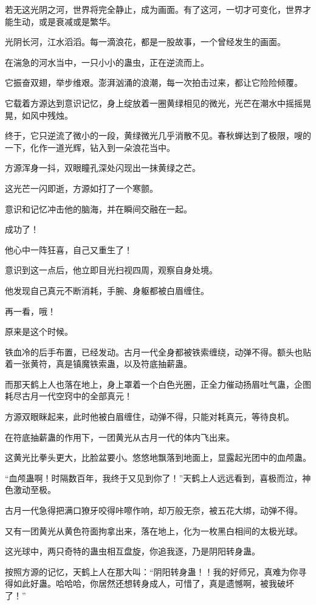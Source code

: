 \begin{this_body}
若无这光阴之河，世界将完全静止，成为画面。有了这河，一切才可变化，世界才能生动，或是衰减或是繁华。

光阴长河，江水滔滔。每一滴浪花，都是一股故事，一个曾经发生的画面。

在湍急的河水当中，一只小小的蛊虫，正在逆流而上。

它振奋双翅，举步维艰。澎湃汹涌的浪潮，每一次拍击过来，都让它险险倾覆。

它载着方源达到意识记忆，身上绽放着一圈黄绿相见的微光，光芒在潮水中摇摇晃晃，如风中残烛。

终于，它只逆流了微小的一段，黄绿微光几乎消散不见。春秋蝉达到了极限，嗖的一下，化作一道光辉，钻入到一朵浪花当中。

方源浑身一抖，双眼瞳孔深处闪现出一抹黄绿之芒。

这光芒一闪即逝，方源如打了一个寒颤。

意识和记忆冲击他的脑海，并在瞬间交融在一起。

成功了！

他心中一阵狂喜，自己又重生了！

意识到这一点后，他立即目光扫视四周，观察自身处境。

他发现自己真元不断消耗，手腕、身躯都被白眉缠住。

再一看，哦！

原来是这个时候。

铁血冷的后手布置，已经发动。古月一代全身都被铁索缠绕，动弹不得。额头也贴着一张黄符，真是镇魔铁索蛊，以及符底抽薪蛊。

而那天鹤上人也落在地上，身上罩着一个白色光圈，正全力催动扬眉吐气蛊，企图耗尽古月一代空窍中的全部真元！

方源双眼眯起来，此时他被白眉缠住，动弹不得，只能对耗真元，等待良机。

在符底抽薪蛊的作用下，一团黄光从古月一代的体内飞出来。

这黄光比拳头更大，比脸盆要小。悠悠地飘落到地面上，显露起光团中的血颅蛊。

“血颅蛊啊！时隔数百年，我终于又见到你了！”天鹤上人远远看到，喜极而泣，神色激动至极。

古月一代急得把满口獠牙咬得咔嚓作响，却万般无奈，被五花大绑，动弹不得。

又有一团黄光从黄色符面拘拿出来，落在地上，化为一枚黑白相间的太极光球。

这光球中，两只奇特的蛊虫相互盘旋，你追我逐，乃是阴阳转身蛊。

按照方源的记忆，天鹤上人在那大叫：“阴阳转身蛊！！我的好师兄，真难为你寻得如此好蛊。哈哈哈，你居然还想转身成人，可惜了，真是遗憾啊，被我破坏了！”


\end{this_body}
